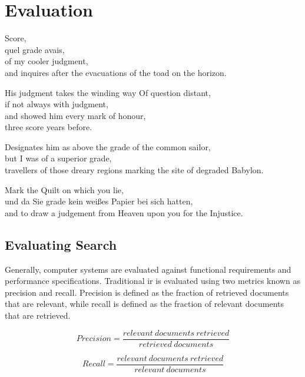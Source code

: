 
\chapter{Evaluation}
\label{ch:evaluation}

\startcontents[chapters]

\vfill

Score, \\
quel grade avais, \\
of my cooler judgment, \\
and inquires after the evacuations of the toad on the horizon.

His judgment takes the winding way Of question distant, \\
if not always with judgment, \\
and showed him every mark of honour, \\
three score years before.

Designates him as above the grade of the common sailor, \\
but I was of a superior grade, \\
travellers of those dreary regions marking the site of degraded Babylon.

Mark the Quilt on which you lie, \\
und da Sie grade kein weißes Papier bei sich hatten, \\
and to draw a judgement from Heaven upon you for the Injustice.

\newpage
\minicontents
\spirals

\section{Evaluating Search}
\label{s:evalsearch}

Generally, computer systems are evaluated against functional requirements and performance specifications. Traditional \gls{ir} is evaluated using two metrics known as precision and recall. Precision is defined as the fraction of retrieved documents that are relevant, while recall is defined as the fraction of relevant documents that are retrieved.

\begin{equation}
  Precision = \frac{relevant \ documents \ retrieved}{retrieved \ documents}
  \label{eq:precision}
\end{equation}

\begin{equation}
  Recall = \frac{relevant \ documents \ retrieved}{relevant \ documents}
\label{eq:recall}
\end{equation}

